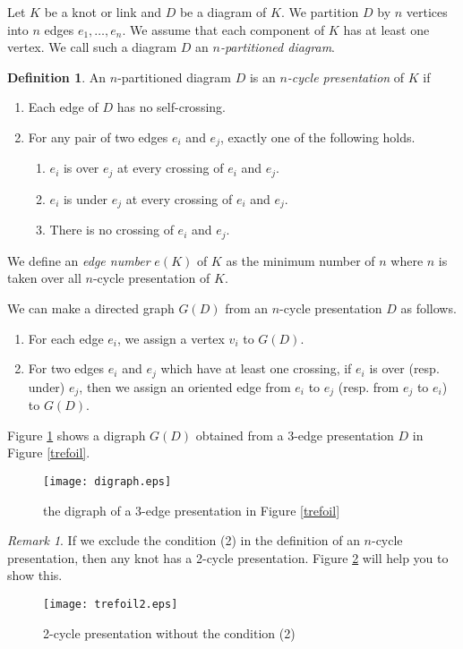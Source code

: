 \documentclass{amsart}
\theoremstyle{definition}
\newtheorem{definition}[theorem]{Definition}
\theoremstyle{remark}
\newtheorem{remark}[theorem]{Remark}
\numberwithin{equation}{section}
\begin{document}
Let $K$ be a knot or link and $D$ be a diagram of $K$.
We partition $D$ by $n$ vertices into $n$ edges $e_1,\ldots, e_n$.
We assume that each component of $K$ has at least one vertex.
We call such a diagram $D$ an {\em $n$-partitioned diagram}.

\begin{definition}
An $n$-partitioned diagram $D$ is an {\em $n$-cycle presentation} of $K$ if
\begin{enumerate}
\item Each edge of $D$ has no self-crossing.
\item For any pair of two edges $e_i$ and $e_j$, exactly one of the following holds.
	\begin{enumerate}
	\item $e_i$ is over $e_j$ at every crossing of $e_i$ and $e_j$.
	\item $e_i$ is under $e_j$ at every crossing of $e_i$ and $e_j$.
	\item There is no crossing of $e_i$ and $e_j$.
	\end{enumerate}
\end{enumerate}

We define an {\em edge number} $e(K)$ of $K$ as the minimum number of $n$ where $n$ is taken over all $n$-cycle presentation of $K$.

We can make a directed graph $G(D)$ from an $n$-cycle presentation $D$ as follows.
\begin{enumerate}
\item For each edge $e_i$, we assign a vertex $v_i$ to $G(D)$.
\item For two edges $e_i$ and $e_j$ which have at least one crossing, if $e_i$ is over (resp. under) $e_j$, then we assign an oriented edge from $e_i$ to $e_j$ (resp. from $e_j$ to $e_i$) to $G(D)$.
\end{enumerate}
\end{definition}

Figure \ref{digraph} shows a digraph $G(D)$ obtained from a 3-edge presentation $D$ in Figure \ref{trefoil}.

\begin{figure}[htbp]
	\begin{center}
		\texttt{[image: digraph.eps]}
	\end{center}
	\caption{the digraph of a 3-edge presentation in Figure \ref{trefoil}}
	\label{digraph}
\end{figure}

\begin{remark}
If we exclude the condition (2) in the definition of an $n$-cycle presentation, then any knot has a 2-cycle presentation.
Figure \ref{trefoil2} will help you to show this.
\begin{figure}[htbp]
	\begin{center}
		\texttt{[image: trefoil2.eps]}
	\end{center}
	\caption{2-cycle presentation without the condition (2)}
	\label{trefoil2}
\end{figure}
\end{remark}
\end{document}
